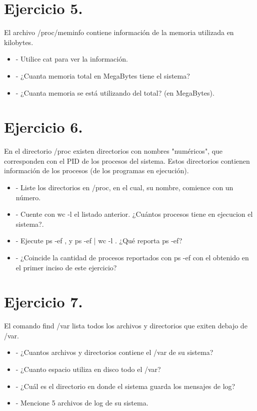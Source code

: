 \documentclass[12pt]{article}
\begin{document}
\section{Ejercicio 5.}
El archivo /proc/meminfo contiene información de la memoria utilizada en kilobytes.

\begin{itemize}
\item - Utilice cat para ver la información.
\item - ¿Cuanta memoria total en MegaBytes tiene el sistema?
\item - ¿Cuanta memoria se está utilizando del total? (en MegaBytes).
\end{itemize}


\section{Ejercicio 6.}
En el directorio /proc existen directorios con nombres "numéricos", que corresponden con el PID de los procesos del sistema.
Estos directorios contienen información de los procesos (de los programas en ejecución).
\begin{itemize}
\item - Liste los directorios en /proc, en el cual, su nombre, comience con un número.
\item - Cuente con wc -l el listado anterior. ¿Cuántos procesos tiene en ejecucion el sistema?.
\item - Ejecute ps -ef , y ps -ef | wc -l . ¿Qué reporta ps -ef?
\item - ¿Coincide la cantidad de procesos reportados con ps -ef con el obtenido en el primer inciso de este ejercicio?
\end{itemize}


\section{Ejercicio 7.}
El comando find /var lista todos los archivos y directorios que exiten debajo de /var.
\begin{itemize}
\item - ¿Cuantos archivos y directorios contiene el /var de su sistema?
\item - ¿Cuanto espacio utiliza en disco todo el /var?
\item - ¿Cuál es el directorio en donde el sistema guarda los mensajes de log?
\item - Mencione 5 archivos de log de su sistema.
\end{itemize}
\end{document}
